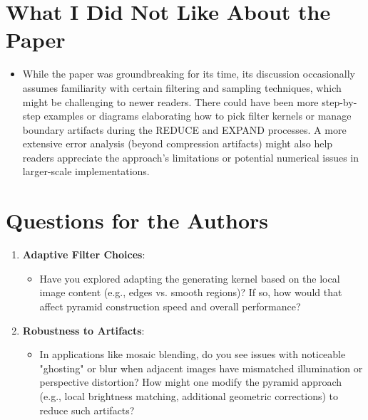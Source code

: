 \documentclass[12pt]{article}
\begin{document}
\section{What I Did Not Like About the Paper}
\begin{itemize}[noitemsep]
    \item While the paper was groundbreaking for its time, its discussion occasionally assumes familiarity with certain filtering and sampling techniques, which might be challenging to newer readers. There could have been more step-by-step examples or diagrams elaborating how to pick filter kernels or manage boundary artifacts during the REDUCE and EXPAND processes. A more extensive error analysis (beyond compression artifacts) might also help readers appreciate the approach's limitations or potential numerical issues in larger-scale implementations.
\end{itemize}

\section{Questions for the Authors}
\begin{enumerate}[noitemsep]
    \item \textbf{Adaptive Filter Choices}:
    \begin{itemize}[noitemsep]
        \item Have you explored adapting the generating kernel based on the local image content (e.g., edges vs. smooth regions)? If so, how would that affect pyramid construction speed and overall performance?
    \end{itemize}
    \item \textbf{Robustness to Artifacts}:
    \begin{itemize}[noitemsep]
        \item In applications like mosaic blending, do you see issues with noticeable "ghosting" or blur when adjacent images have mismatched illumination or perspective distortion? How might one modify the pyramid approach (e.g., local brightness matching, additional geometric corrections) to reduce such artifacts?
    \end{itemize}
\end{enumerate}
\end{document}
